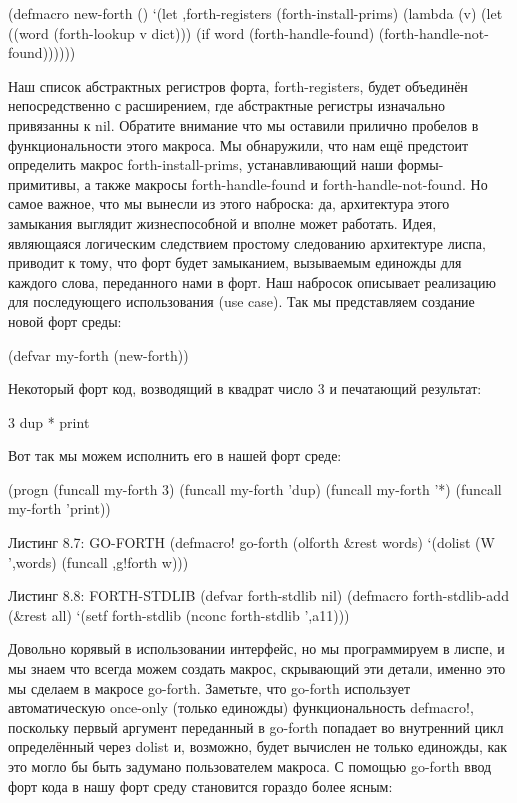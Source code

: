 (defmacro new-forth ()
  ‘(let ,forth-registers
      (forth-install-prims)
      (lambda (v)
         (let ((word (forth-lookup v dict)))
            (if word
              (forth-handle-found)
              (forth-handle-not-found))))))

Наш список абстрактных регистров форта, forth-registers, будет объединён непосредственно с расширением, где абстрактные регистры изначально привязанны к nil. Обратите внимание что мы оставили прилично пробелов в функциональности этого макроса. Мы обнаружили, что нам ещё предстоит определить макрос forth-install-prims, устанавливающий наши формы-примитивы, а также макросы forth-handle-found и forth-handle-not-found. Но самое важное, что мы вынесли из этого наброска: да, архитектура этого замыкания выглядит жизнеспособной и вполне может работать. Идея, являющаяся логическим следствием простому следованию архитектуре лиспа, приводит к тому, что форт будет замыканием, вызываемым единожды для каждого слова, переданного нами в форт. Наш набросок описывает реализацию для последующего использования (use case). Так мы представляем создание новой форт среды:

(defvar my-forth (new-forth))

Некоторый форт код, возводящий в квадрат число 3 и печатающий результат:

3 dup * print

Вот так мы можем исполнить его в нашей форт среде:

(progn
(funcall my-forth 3)
(funcall my-forth ’dup)
(funcall my-forth ’*)
(funcall my-forth ’print))

Листинг 8.7: GO-FORTH
(defmacro! go-forth (olforth &rest words)
‘(dolist (W ’,words)
(funcall ,g!forth w)))

Листинг 8.8: FORTH-STDLIB
(defvar forth-stdlib nil)
(defmacro forth-stdlib-add (&rest all)
‘(setf forth-stdlib
(nconc forth-stdlib
’,a11)))

Довольно корявый в использовании интерфейс, но мы программируем в лиспе, и мы знаем что всегда можем создать макрос, скрывающий эти детали, именно это мы сделаем в макросе go-forth. Заметьте, что go-forth использует автоматическую once-only (только единожды) функциональность defmacro!, поскольку первый аргумент переданный в go-forth попадает во внутренний цикл определённый через dolist и, возможно, будет вычислен не только единожды, как это могло бы быть задумано пользователем макроса. С помощью go-forth ввод форт кода в нашу форт среду становится гораздо более ясным:

